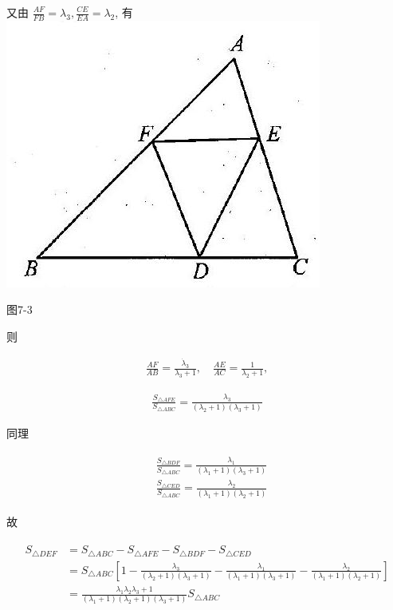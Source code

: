 \documentclass[10pt]{article}
\begin{document}
又由 $\frac{A F}{F B}=\lambda_{3}, \frac{C E}{E A}=\lambda_{2}$, 有\\
\includegraphics[max width=\textwidth, center]{2024_10_30_2c8f45efd4a519b08e1ag-076}

图7-3

则

\begin{align*}
\frac{A F}{A B}=\frac{\dot{\lambda}_{3}}{\lambda_{3}+1}, \quad \frac{A E}{A C}=\frac{1}{\lambda_{2}+1},
\end{align*}

\begin{align*}
\frac{S_{\triangle A F E}}{S_{\triangle A B C}}=\frac{\lambda_{3}}{\left(\lambda_{2}+1\right)\left(\lambda_{3}+1\right)}
\end{align*}

同理

\begin{align*}
\begin{aligned}
& \frac{S_{\triangle B D F}}{S_{\triangle A B C}}=\frac{\lambda_{1}}{\left(\lambda_{1}+1\right)\left(\lambda_{3}+1\right)} \\
& \frac{S_{\triangle C E D}}{S_{\triangle A B C}}=\frac{\lambda_{2}}{\left(\lambda_{1}+1\right)\left(\lambda_{2}+1\right)}
\end{aligned}
\end{align*}

故

\begin{align*}
\begin{aligned}
S_{\triangle D E F} & =S_{\triangle A B C}-S_{\triangle A F E}-S_{\triangle B D F}-S_{\triangle C E D} \\
& =S_{\triangle A B C}\left[1-\frac{\lambda_{3}}{\left(\lambda_{2}+1\right)\left(\lambda_{3}+1\right)}-\frac{\lambda_{1}}{\left(\lambda_{1}+1\right)\left(\lambda_{3}+1\right)}-\frac{\lambda_{2}}{\left(\lambda_{1}+1\right)\left(\lambda_{2}+1\right)}\right] \\
& =\frac{\lambda_{1} \lambda_{2} \lambda_{3}+1}{\left(\lambda_{1}+1\right)\left(\lambda_{2}+1\right)\left(\lambda_{3}+1\right)} S_{\triangle A B C}
\end{aligned}
\end{align*}
\end{document}
